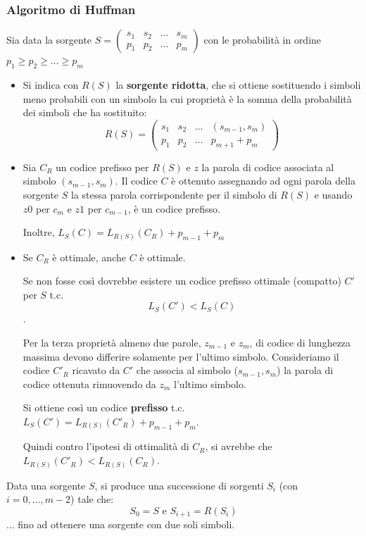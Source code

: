 \subsubsection{Algoritmo di Huffman}
Sia data la sorgente $S = \begin{pmatrix}
s_1 & s_2 & \dots & s_m\\
p_1 & p_2 & \dots & p_m
\end{pmatrix}$ con le probabilità in ordine $p_1 \geq p_2 \geq \dots \geq p_m$
\begin{itemize}
    \item Si indica con $R(S)$ la \textbf{sorgente ridotta}, che si ottiene sostituendo i simboli meno probabili con un simbolo la cui proprietà è la somma della probabilità dei simboli che ha sostituito:
    \[
    R(S) = \begin{pmatrix}
s_1 & s_2 & \dots & (s_{m-1},s_m)\\
p_1 & p_2 & \dots & p_{m+1} + p_m
\end{pmatrix}
    \]
    \item Sia $C_R$ un codice prefisso per $R(S)$ e $z$ la parola di codice associata al simbolo $(s_{m-1},s_m)$. Il codice $C$ è ottenuto assegnando ad ogni parola della sorgente $S$ la stessa parola corrispondente per il simbolo di $R(S)$ e usando $z0$ per $c_m$ e $z1$ per $c_{m-1}$, è un codice prefisso.
    
    Inoltre, $L_S(C) = L_{R(S)}(C_R) + p_{m-1} + p_m$

    \item Se $C_R$ è ottimale, anche $C$ è ottimale.
    
    Se non fosse così dovrebbe esistere un codice prefisso ottimale (compatto) $C'$ per $S$ \mbox{t.c.}
    \[L_S(C') < L_S(C)\].
  
    Per la terza proprietà almeno due parole, $z_{m-1}$ e $z_m$, di codice di lunghezza massima devono differire solamente per l'ultimo simbolo.
    Consideriamo il codice $C'_R$ ricavato da $C'$ che associa al simbolo ($s_{m-1},s_m$) la parola di codice ottenuta rimuovendo da $z_m$ l'ultimo simbolo.
 
    Si ottiene così un codice \textbf{prefisso} \mbox{t.c.} $L_S(C') = L_{R(S)}(C'_R) + p_{m-1} + p_m$. 

    Quindi contro l'ipotesi di ottimalità di $C_R$, si avrebbe che $L_{R(S)}(C'_R) < L_{R(S)}(C_R)$.
\end{itemize}

Data una sorgente $S$, si produce una successione di sorgenti $S_i$ (con $i=0,\dots,m-2$) tale che:
\[
S_0 = S \text{ e } S_{i+1} = R(S_i)
\]
...
fino ad ottenere una sorgente con due soli simboli.

